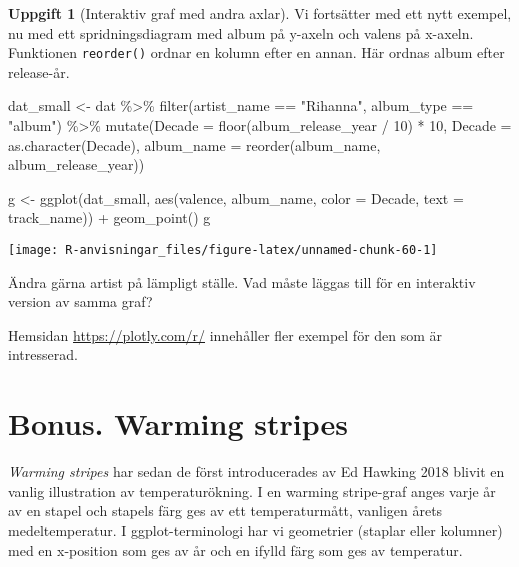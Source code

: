 \documentclass[
]{book}
\newenvironment{Shaded}{\begin{snugshade}}{\end{snugshade}}
\newcommand{\AttributeTok}[1]{\textcolor[rgb]{0.77,0.63,0.00}{#1}}
\newcommand{\DecValTok}[1]{\textcolor[rgb]{0.00,0.00,0.81}{#1}}
\newcommand{\FunctionTok}[1]{\textcolor[rgb]{0.00,0.00,0.00}{#1}}
\newcommand{\NormalTok}[1]{#1}
\newcommand{\OtherTok}[1]{\textcolor[rgb]{0.56,0.35,0.01}{#1}}
\newcommand{\SpecialCharTok}[1]{\textcolor[rgb]{0.00,0.00,0.00}{#1}}
\newcommand{\StringTok}[1]{\textcolor[rgb]{0.31,0.60,0.02}{#1}}
\theoremstyle{definition}
\theoremstyle{definition}
\theoremstyle{definition}
\newtheorem{exercise}{Uppgift}[chapter]
\theoremstyle{definition}
\theoremstyle{remark}
\begin{document}
\begin{exercise}[Interaktiv graf med andra axlar]
Vi fortsätter med ett nytt exempel, nu med ett spridningsdiagram med album på y-axeln och valens på x-axeln. Funktionen \texttt{reorder()} ordnar en kolumn efter en annan. Här ordnas album efter release-år.

\begin{Shaded}
\begin{Highlighting}[]
\NormalTok{dat\_small }\OtherTok{\textless{}{-}}\NormalTok{ dat }\SpecialCharTok{\%\textgreater{}\%} 
  \FunctionTok{filter}\NormalTok{(artist\_name }\SpecialCharTok{==} \StringTok{"Rihanna"}\NormalTok{, album\_type }\SpecialCharTok{==} \StringTok{"album"}\NormalTok{) }\SpecialCharTok{\%\textgreater{}\%} 
  \FunctionTok{mutate}\NormalTok{(}\AttributeTok{Decade =} \FunctionTok{floor}\NormalTok{(album\_release\_year }\SpecialCharTok{/} \DecValTok{10}\NormalTok{) }\SpecialCharTok{*} \DecValTok{10}\NormalTok{,}
         \AttributeTok{Decade =} \FunctionTok{as.character}\NormalTok{(Decade),}
         \AttributeTok{album\_name =} \FunctionTok{reorder}\NormalTok{(album\_name, album\_release\_year))}

\NormalTok{g }\OtherTok{\textless{}{-}} \FunctionTok{ggplot}\NormalTok{(dat\_small, }\FunctionTok{aes}\NormalTok{(valence, album\_name, }\AttributeTok{color =}\NormalTok{ Decade, }\AttributeTok{text =}\NormalTok{ track\_name)) }\SpecialCharTok{+}
  \FunctionTok{geom\_point}\NormalTok{()}
\NormalTok{g}
\end{Highlighting}
\end{Shaded}

\begin{center}\texttt{[image: R-anvisningar\_files/figure-latex/unnamed-chunk-60-1]} \end{center}

Ändra gärna artist på lämpligt ställe.
Vad måste läggas till för en interaktiv version av samma graf?
\end{exercise}

Hemsidan \url{https://plotly.com/r/} innehåller fler exempel för den som är intresserad.

\hypertarget{bonus.-warming-stripes}{%
\section{Bonus. Warming stripes}\label{bonus.-warming-stripes}}

\emph{Warming stripes} har sedan de först introducerades av Ed Hawking 2018 blivit en vanlig illustration av temperaturökning. I en warming stripe-graf anges varje år av en stapel och stapels färg ges av ett temperaturmått, vanligen årets medeltemperatur. I ggplot-terminologi har vi geometrier (staplar eller kolumner) med en x-position som ges av år och en ifylld färg som ges av temperatur.
\end{document}
